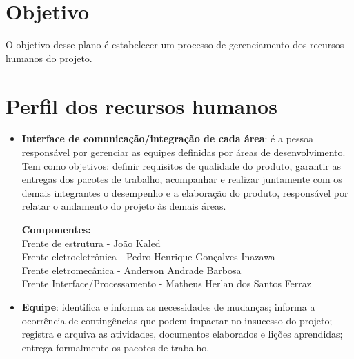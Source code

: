 \begin{apendicesenv}
\begin{table}[h]
\begin{tabular}{|c|c|p{6cm}|p{5cm}|}
\hline
\end{tabular}
\end{table}

\section*{Objetivo}
  O objetivo desse plano é estabelecer um processo de gerenciamento dos recursos humanos do projeto.
  
  \section*{Perfil dos recursos humanos}
  \begin{itemize}
   \item \textbf{Interface de comunicação/integração de cada área}: é a pessoa responsável por gerenciar as equipes definidas por áreas de desenvolvimento. Tem como objetivos: definir requisitos de qualidade do produto, garantir as entregas dos pacotes de trabalho, acompanhar e realizar juntamente com os demais integrantes o desempenho e a elaboração do produto, responsável por relatar o andamento do projeto às demais áreas.
   
\textbf{Componentes:}\\
Frente de estrutura - João Kaled\\
Frente eletroeletrônica - Pedro Henrique Gonçalves Inazawa\\
Frente eletromecânica - Anderson Andrade Barbosa\\
Frente Interface/Processamento - Matheus Herlan dos Santos Ferraz\\


  \item \textbf{Equipe}: identifica e informa as necessidades de mudanças; informa a ocorrência de contingências que podem impactar no insucesso do projeto; registra e arquiva as atividades, documentos elaborados e lições aprendidas; entrega formalmente os pacotes de trabalho.\\
  

\end{itemize}
\end{apendicesenv}
